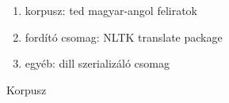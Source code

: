 \begin{frame}
	\begin{enumerate}
		\item korpusz: ted magyar-angol feliratok
	
		\item fordító csomag: NLTK translate package
		
		\item egyéb: dill szerializáló csomag
		
	\end{enumerate}
\end{frame}

\begin{frame}{Korpusz}
	\begin{itemize}
		
	\end{itemize}
\end{frame}